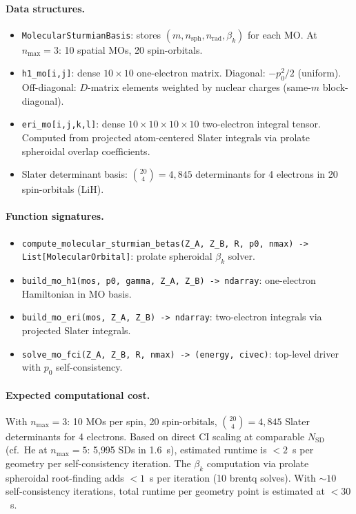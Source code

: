 \documentclass[aps,pra,twocolumn,superscriptaddress,longbibliography,floatfix]{revtex4-2}
\begin{document}
\paragraph{Data structures.}
\begin{itemize}
\item \texttt{MolecularSturmianBasis}: stores $(m, n_{\text{sph}},
n_{\text{rad}}, \beta_k)$ for each MO.  At $n_{\max} = 3$:
10 spatial MOs, 20 spin-orbitals.

\item \texttt{h1\_mo[i,j]}: dense $10 \times 10$ one-electron matrix.
Diagonal: $-p_0^2/2$ (uniform).  Off-diagonal: $D$-matrix elements
weighted by nuclear charges (same-$m$ block-diagonal).

\item \texttt{eri\_mo[i,j,k,l]}: dense $10 \times 10 \times 10 \times 10$
two-electron integral tensor.  Computed from projected atom-centered
Slater integrals via prolate spheroidal overlap coefficients.

\item Slater determinant basis: $\binom{20}{4} = 4{,}845$ determinants
for 4 electrons in 20 spin-orbitals (LiH).
\end{itemize}

\paragraph{Function signatures.}
\begin{itemize}
\item \texttt{compute\_molecular\_sturmian\_betas(Z\_A, Z\_B, R, p0,
nmax) -> List[MolecularOrbital]}: prolate spheroidal $\beta_k$ solver.

\item \texttt{build\_mo\_h1(mos, p0, gamma, Z\_A, Z\_B) -> ndarray}:
one-electron Hamiltonian in MO basis.

\item \texttt{build\_mo\_eri(mos, Z\_A, Z\_B) -> ndarray}: two-electron
integrals via projected Slater integrals.

\item \texttt{solve\_mo\_fci(Z\_A, Z\_B, R, nmax) -> (energy, civec)}:
top-level driver with $p_0$ self-consistency.
\end{itemize}

\paragraph{Expected computational cost.}
With $n_{\max} = 3$: 10 MOs per spin, 20 spin-orbitals,
$\binom{20}{4} = 4{,}845$ Slater determinants for 4 electrons.
Based on direct CI scaling at comparable $N_{\text{SD}}$ (cf.\
He at $n_{\max} = 5$: 5{,}995 SDs in 1.6~s), estimated runtime
is $< 2$~s per geometry per self-consistency iteration.
The $\beta_k$ computation via prolate spheroidal root-finding adds
$< 1$~s per iteration (10 brentq solves).  With $\sim 10$
self-consistency iterations, total runtime per geometry point is
estimated at $< 30$~s.
\end{document}
